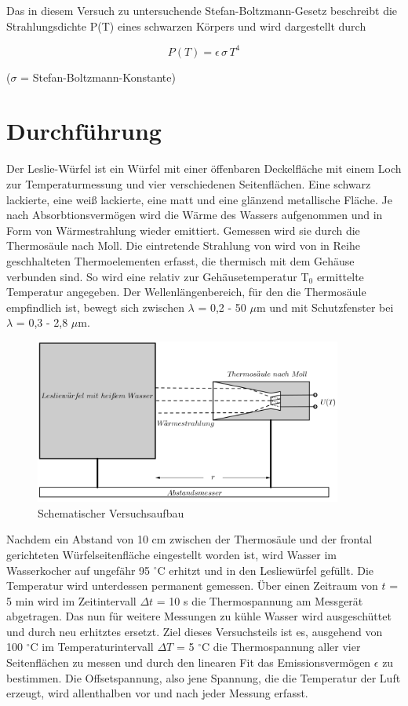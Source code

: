 Das in diesem Versuch zu untersuchende Stefan-Boltzmann-Gesetz beschreibt die Strahlungsdichte P(T) eines schwarzen Körpers und wird
dargestellt durch

\begin{formel}
\begin{equation}
 P(T) = \epsilon \, \sigma \, T^4
 \end{equation}
\caption*{\small{($\sigma$ = Stefan-Boltzmann-Konstante)}}
\label{Boltz}
\end{formel}

\section{Durchführung}
Der Leslie-Würfel ist ein Würfel mit einer öffenbaren Deckelfläche mit einem Loch zur Temperaturmessung und vier verschiedenen Seitenflächen.
Eine schwarz lackierte, eine weiß lackierte, eine matt und eine glänzend metallische Fläche. Je nach Absorbtionsvermögen wird die Wärme
des Wassers aufgenommen und in Form von Wärmestrahlung wieder emittiert. Gemessen wird sie durch die Thermosäule nach Moll. Die eintretende
Strahlung von wird von in Reihe geschhalteten Thermoelementen erfasst, die thermisch mit dem Gehäuse verbunden sind. So wird eine relativ
zur Gehäusetemperatur T$_0$ ermittelte Temperatur angegeben. Der Wellenlängenbereich, für den die Thermosäule empfindlich ist, bewegt sich
zwischen $\lambda$ = 0,2 - 50 $\mu$m und mit Schutzfenster bei $\lambda$ = 0,3 - 2,8 $\mu$m.

\begin{figure}[H]
 \includegraphics[width=0.9\textwidth]{pics/207b.png}
 \centering
 \caption{Schematischer Versuchsaufbau}
 \label{Aufbau}
\end{figure}

Nachdem ein Abstand von 10 cm zwischen der Thermosäule und der frontal gerichteten Würfelseitenfläche eingestellt worden ist, wird 
Wasser im Wasserkocher auf ungefähr 95 $^\circ$C erhitzt und in den Lesliewürfel gefüllt. Die Temperatur wird unterdessen permanent
gemessen. Über einen Zeitraum von $t$ = 5 min wird im Zeitintervall $\Delta t$ = 10 s die Thermospannung am Messgerät abgetragen. Das
nun für weitere Messungen zu kühle Wasser wird ausgeschüttet und durch neu erhitztes ersetzt. Ziel dieses Versuchsteils ist es, ausgehend
von 100 $^\circ$C im Temperaturintervall $\Delta T$ = 5 $^\circ$C die Thermospannung aller vier Seitenflächen zu messen und durch den
linearen Fit das Emissionsvermögen $\epsilon$ zu bestimmen. Die Offsetspannung, also jene Spannung, die die Temperatur der Luft
erzeugt, wird allenthalben vor und nach jeder Messung erfasst.

